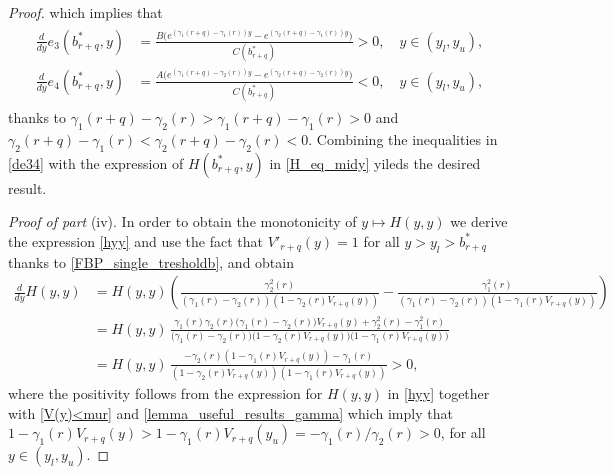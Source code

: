 \documentclass[11pt]{article} %
\numberwithin{komcounter}{section}
\numberwithin{equation}{section}
\numberwithin{theorem}{section}
\begin{document}
\begin{proof}
which implies that 
\begin{align} \label{de34}
\begin{split}
\frac{d}{dy} e_3(b^*_{r+q},y) 
&= \frac{B \big(e^{(\gamma_1(r+q)-\gamma_1(r))y} - e^{(\gamma_2(r+q)-\gamma_1(r))y}\big)}{C(b^*_{r+q})}
>0, \quad  y \in (y_l,y_u), \\
\frac{d}{dy} e_4(b^*_{r+q},y) 
&= \frac{A \big(e^{(\gamma_1(r+q)-\gamma_2(r))y} - e^{(\gamma_2(r+q)-\gamma_2(r))y}\big)}{C(b^*_{r+q})}
<0, \quad  y \in (y_l,y_u),
\end{split}
\end{align}
thanks to $\gamma_1(r+q)-\gamma_2(r)>\gamma_1(r+q)-\gamma_1(r)>0$ and $\gamma_2(r+q)-\gamma_1(r)<\gamma_2(r+q)-\gamma_2(r)<0$. 
Combining the inequalities in \eqref{de34} with the expression of $H(b^*_{r+q},y)$ in \eqref{H_eq_midy} yileds the desired result. 

\vspace{1mm} 
{\it Proof of part} (iv).
In order to obtain the monotonicity of $y \mapsto H(y,y)$ we derive the expression \eqref{hyy} and use the fact that $V'_{r+q}(y)=1$ for all $y > y_l > b^*_{r+q}$ thanks to \eqref{FBP_single_tresholdb}, and obtain 
\begin{align*}
\frac{d}{dy} H(y,y) 
&= H(y,y) \left(\frac{\gamma_2^2(r)}{(\gamma_1(r)-\gamma_2(r))(1-\gamma_2(r)V_{r+q}(y))}-\frac{\gamma_1^2(r)}{(\gamma_1(r)-\gamma_2(r))(1-\gamma_1(r)V_{r+q}(y))}\right)\\
&=  H(y,y) \, \frac{\gamma_1(r) \gamma_2(r) \big(\gamma_1(r)-\gamma_2(r) \big) V_{r+q}(y) + \gamma_2^2(r) - \gamma_1^2(r)}{\big(\gamma_1(r)-\gamma_2(r) \big) \big(1 - \gamma_2(r) V_{r+q}(y) \big) \big(1 - \gamma_1(r) V_{r+q}(y) \big)} \\
&= H(y,y) \, \frac{-\gamma_2(r)\left(1 - \gamma_1(r)V_{r+q}(y)\right) -\gamma_1(r)}{(1-\gamma_2(r)V_{r+q}(y))(1-\gamma_1(r)V_{r+q}(y))} > 0,
\end{align*}
where the positivity follows from the expression for $H(y,y)$ in \eqref{hyy} together with \eqref{V(y)<mur} and \eqref{lemma_useful_results_gamma} which imply that $1 - \gamma_1(r)V_{r+q}(y) > 1 - \gamma_1(r)V_{r+q}(y_u) = -\gamma_1(r)/\gamma_2(r) > 0$, for all $y \in (y_l, y_u)$. 
\end{proof}
\end{document}
